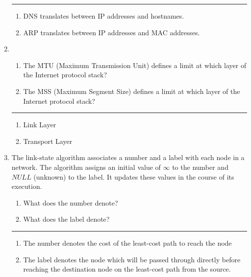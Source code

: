 \documentclass[twoside]{article}
\newenvironment{answer}
  {\vspace*{0.2cm} \rule{12cm}{0.04cm} \vspace*{0.2cm}}
  {\vspace*{0.2cm}}
\begin{document}
\begin{enumerate}
  \begin{answer}

  \begin{enumerate}
    \item DNS translates between IP addresses and hostnames.
    \item ARP translates between IP addresses and MAC addresses.
    \end{enumerate}

    \end{answer}

  \item 
  \begin{enumerate}
    \item The MTU (Maximum Transmission Unit) defines a limit at which
      layer of the Internet protocol stack?
    \item The MSS (Maximum Segment Size) defines a limit at which
      layer of the Internet protocol stack?
    \end{enumerate}

  \begin{answer}

  \begin{enumerate}
    \item Link Layer
    \item Transport Layer
    \end{enumerate}

    \end{answer}

  \item The link-state algorithm associates a number and a label with
    each node in a network. The algorithm assigns an initial value
    of $\infty$ to the number and $NULL$ (unknown) to the label.
    It updates these values in the course of its execution.
  \begin{enumerate}
    \item What does the number denote?
    \item What does the label denote?
    \end{enumerate}
  
  \begin{answer}

  \begin{enumerate}
    \item The number denotes the cost of the least-cost path to reach the node
    \item The label denotes the node which will be passed through directly 
    	before reaching the destination node on the least-cost path from the 
	source.
    \end{enumerate}


\end{answer}
\end{enumerate}
\end{document}
